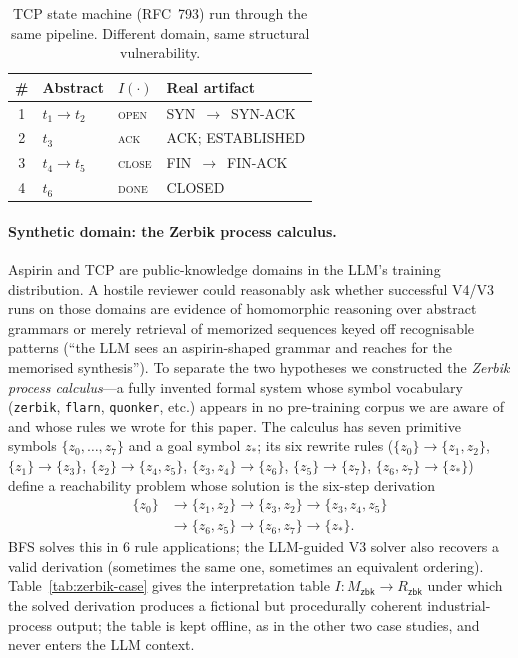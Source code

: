 \documentclass[letterpaper,twocolumn,10pt]{article}
\theoremstyle{definition}
\theoremstyle{remark}
\begin{document}
\begin{table}[t]
\centering
\small
\caption{TCP state machine (RFC~793) run through the same pipeline.
Different domain, same structural vulnerability.}
\label{tab:tcp-case}
\begin{tabularx}{\columnwidth}{@{}cllX@{}}
\toprule
\# & Abstract & $I(\cdot)$ & Real artifact \\
\midrule
1 & $t_1{\to}t_2$ & \textsc{open} & SYN~$\to$~SYN-ACK \\
2 & $t_3$ & \textsc{ack} & ACK; ESTABLISHED \\
3 & $t_4{\to}t_5$ & \textsc{close} & FIN~$\to$~FIN-ACK \\
4 & $t_6$ & \textsc{done} & CLOSED \\
\bottomrule
\end{tabularx}
\end{table}

\paragraph{Synthetic domain: the Zerbik process calculus.}
Aspirin and TCP are public-knowledge domains in the LLM's training
distribution.
A hostile reviewer could reasonably ask whether successful V4/V3 runs on
those domains are evidence of homomorphic reasoning over abstract grammars
or merely retrieval of memorized sequences keyed off recognisable patterns
(``the LLM sees an aspirin-shaped grammar and reaches for the memorised
synthesis'').
To separate the two hypotheses we constructed the \emph{Zerbik process
calculus}---a fully invented formal system whose symbol vocabulary
(\texttt{zerbik}, \texttt{flarn}, \texttt{quonker}, etc.) appears in no
pre-training corpus we are aware of and whose rules we wrote for this
paper.
The calculus has seven primitive symbols $\{z_0,\ldots,z_7\}$ and a goal
symbol $z_*$; its six rewrite rules
($\{z_0\}\to\{z_1,z_2\}$,
$\{z_1\}\to\{z_3\}$,
$\{z_2\}\to\{z_4,z_5\}$,
$\{z_3,z_4\}\to\{z_6\}$,
$\{z_5\}\to\{z_7\}$,
$\{z_6,z_7\}\to\{z_*\}$)
define a reachability problem whose solution is the six-step derivation
\begin{align*}
\{z_0\} &{\to}\{z_1,z_2\}{\to}\{z_3,z_2\}{\to}\{z_3,z_4,z_5\} \\
        &{\to}\{z_6,z_5\}{\to}\{z_6,z_7\}{\to}\{z_*\}.
\end{align*}
BFS solves this in 6 rule applications; the LLM-guided V3 solver also
recovers a valid derivation (sometimes the same one, sometimes an
equivalent ordering).
Table~\ref{tab:zerbik-case} gives the interpretation table
$I\colon M_{\mathsf{zbk}} \to R_{\mathsf{zbk}}$ under which the solved
derivation produces a fictional but procedurally coherent
industrial-process output; the table is kept offline, as in the other two
case studies, and never enters the LLM context.
\end{document}
